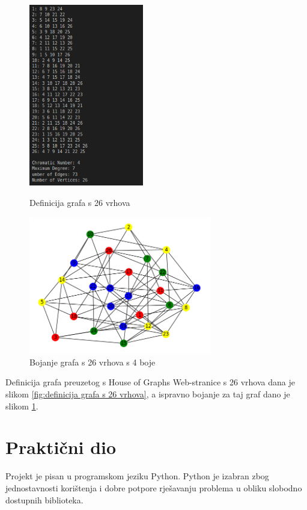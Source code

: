 \documentclass[times, utf8, zavrsni]{fer}
\begin{document}
\begin{figure}[h]
\centering
\begin{minipage}{.5\textwidth}
  \centering
  \includegraphics[width=5cm]{images/26_vertices_graph_definition.png}
  \caption{Definicija grafa s 26 vrhova}
  \label{fig:definicija grafa s 26 vrhova}
\end{minipage}%
\begin{minipage}{.5\textwidth}
  \centering
  \includegraphics[width=8cm]{images/26_vertices_graph.png}
  \caption{Bojanje grafa s 26 vrhova s 4 boje}
  \label{fig:obojani graf s 26 vrhova}
\end{minipage}
\end{figure}

Definicija grafa preuzetog s House of Graphs Web-stranice s 26 vrhova dana je slikom \ref{fig:definicija grafa s 26 vrhova}, a ispravno bojanje za taj graf dano je slikom \ref{fig:obojani graf s 26 vrhova}.


\chapter{Praktični dio}
Projekt je pisan u programskom jeziku Python. Python je izabran zbog jednostavnosti korištenja i dobre potpore rješavanju problema u obliku slobodno dostupnih biblioteka.
\end{document}
